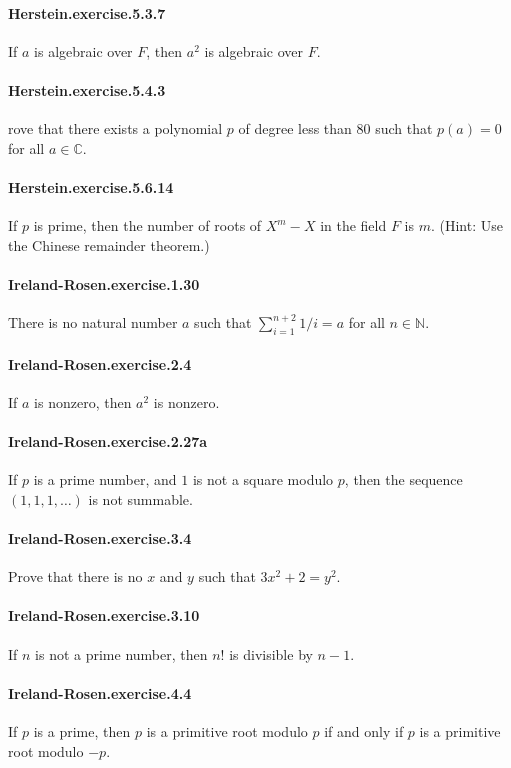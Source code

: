\documentclass{article}
\begin{document}
\paragraph{Herstein.exercise.5.3.7} If $a$ is algebraic over $F$, then $a^2$ is algebraic over $F$.

\paragraph{Herstein.exercise.5.4.3} rove that there exists a polynomial $p$ of degree less than $80$ such that $p(a)=0$ for all $a\in\mathbb{C}$.

\paragraph{Herstein.exercise.5.6.14} If $p$ is prime, then the number of roots of $X^m-X$ in the field $F$ is $m$. (Hint: Use the Chinese remainder theorem.)

\paragraph{Ireland-Rosen.exercise.1.30} There is no natural number $a$ such that $\sum_{i=1}^{n+2} 1/i = a$ for all $n \in \mathbb{N}$.

\paragraph{Ireland-Rosen.exercise.2.4} If $a$ is nonzero, then $a^2$ is nonzero.

\paragraph{Ireland-Rosen.exercise.2.27a} If $p$ is a prime number, and $1$ is not a square modulo $p$, then the sequence $(1, 1, 1, \dots)$ is not summable.

\paragraph{Ireland-Rosen.exercise.3.4} Prove that there is no $x$ and $y$ such that $3x^2 + 2 = y^2$.

\paragraph{Ireland-Rosen.exercise.3.10} If $n$ is not a prime number, then $n!$ is divisible by $n-1$.

\paragraph{Ireland-Rosen.exercise.4.4} If $p$ is a prime, then $p$ is a primitive root modulo $p$ if and only if $p$ is a primitive root modulo $-p$.
\end{document}
